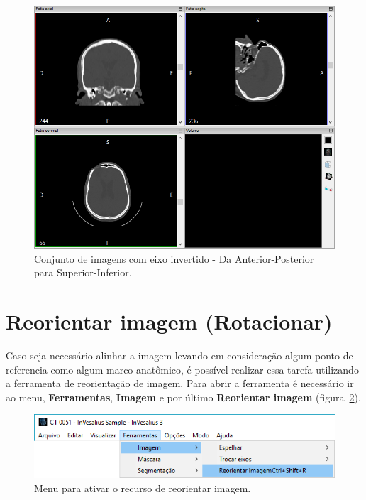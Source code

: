 \begin{figure}[!htbp]
\centering
\includegraphics[scale=0.4]{../user_guide_figures/invesalius_screen/invert_axis_axial_inverted_pt.png}
\caption{Conjunto de imagens com eixo invertido - Da Anterior-Posterior para Superior-Inferior.}
\label{fig:invert_axis_axial_inverted}
\end{figure}

\section{Reorientar imagem (Rotacionar)}

Caso seja necessário alinhar a imagem levando em consideração algum ponto de referencia como algum marco anatômico, é possível realizar essa tarefa utilizando a ferramenta de reorientação de imagem. Para abrir a ferramenta é necessário ir ao menu, \textbf{Ferramentas}, \textbf{Imagem} e por último \textbf{Reorientar imagem} (figura~\ref{fig:menu_img_reorient}).

\begin{figure}[!htbp]
\centering
\includegraphics[scale=0.4]{../user_guide_figures/invesalius_screen/menu_img_reorient_pt.png}
\caption{Menu para ativar o recurso de reorientar imagem.}
\label{fig:menu_img_reorient}
\end{figure}

